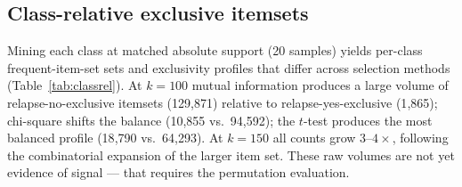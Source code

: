 \documentclass[twocolumn]{article}
\begin{document}
\begin{table}[h]
\centering
\small
\caption{Class-association rules at $k=100$: raw counts and CF-filtered quality.}
\label{tab:car}
\end{table}

\subsection{Class-relative exclusive itemsets}
\label{sec:res-classrel}

Mining each class at matched absolute support (20 samples) yields per-class
frequent-item-set sets and exclusivity profiles that differ across selection
methods (Table~\ref{tab:classrel}). At $k=100$ mutual information produces a
large volume of relapse-no-exclusive itemsets (129{,}871) relative to
relapse-yes-exclusive (1{,}865); chi-square shifts the balance
(10{,}855 vs.\ 94{,}592); the $t$-test produces the most balanced profile
(18{,}790 vs.\ 64{,}293). At $k=150$ all counts grow $3$--$4\times$, following
the combinatorial expansion of the larger item set. These raw volumes are not
yet evidence of signal --- that requires the permutation evaluation.

\begin{table}[h]
\centering
\small
\caption{Class-relative mining: frequent itemsets and class-exclusive itemsets at matched absolute support (20 samples).}
\label{tab:classrel}
\end{table}
\end{document}

